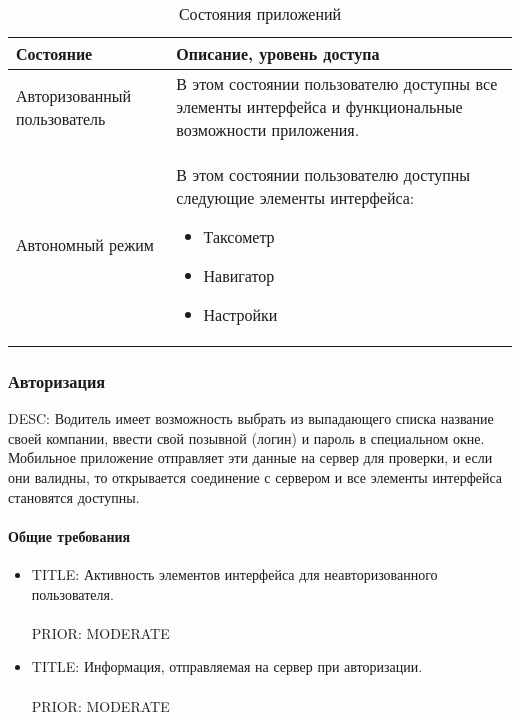              \begin{table}
             \begin{center}
             \caption {Состояния приложений}
             \label{app_state}
             \setlength{\extrarowheight}{2mm}
             \begin{tabular}{|p{5cm}|p{10cm}|}
                 \hline     \textbf{Состояние}&\textbf{Описание, уровень доступа} \\ [2mm]

                 \hline   Авторизованный пользователь & В этом состоянии пользователю доступны все элементы интерфейса и функциональные возможности приложения.\\ [2mm]
                 \hline   Автономный режим & В этом состоянии пользователю доступны следующие элементы интерфейса: \begin{itemize} \item Таксометр \item Навигатор \item Настройки \end{itemize}\\ [2mm]
                  \hline
             \end{tabular}
             \end{center}
             \end{table}

  	  \subsubsection{Авторизация}

  		  DESC: Водитель имеет возможность выбрать из выпадающего списка название своей компании, ввести свой позывной (логин) и пароль в специальном окне. Мобильное приложение отправляет эти данные на сервер для проверки, и если они валидны, то открывается соединение с сервером и все элементы интерфейса становятся доступны.

        \paragraph{Общие требования}
          \begin{itemize}
            \item{
              TITLE: Активность элементов интерфейса для неавторизованного пользователя.\\
              \\
              PRIOR: MODERATE\\}

            \item{
              TITLE: Информация, отправляемая на сервер при авторизации.\\
              \\
              PRIOR: MODERATE\\}
          \end{itemize}  		    

